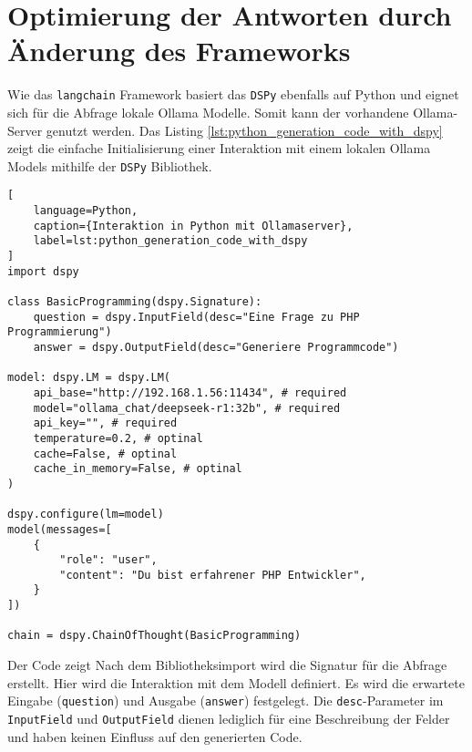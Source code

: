 \section{Optimierung der Antworten durch Änderung des Frameworks}
Wie das \texttt{langchain} Framework basiert das \texttt{DSPy} ebenfalls auf Python und eignet sich für die Abfrage lokale Ollama Modelle. Somit kann der vorhandene Ollama-Server genutzt werden.
Das Listing \ref{lst:python_generation_code_with_dspy} zeigt die einfache Initialisierung einer Interaktion mit einem lokalen Ollama Models mithilfe der \texttt{DSPy} Bibliothek.\vspace{0.2cm}

\begin{lstlisting}[
	language=Python,
	caption={Interaktion in Python mit Ollamaserver},
	label=lst:python_generation_code_with_dspy
]
import dspy

class BasicProgramming(dspy.Signature):
    question = dspy.InputField(desc="Eine Frage zu PHP Programmierung")
    answer = dspy.OutputField(desc="Generiere Programmcode")

model: dspy.LM = dspy.LM(
    api_base="http://192.168.1.56:11434", # required
    model="ollama_chat/deepseek-r1:32b", # required
    api_key="", # required
    temperature=0.2, # optinal
    cache=False, # optinal
    cache_in_memory=False, # optinal
)

dspy.configure(lm=model)
model(messages=[
    {
        "role": "user",
        "content": "Du bist erfahrener PHP Entwickler",
    }
])

chain = dspy.ChainOfThought(BasicProgramming)
\end{lstlisting}

Der Code zeigt Nach dem Bibliotheksimport wird die Signatur für die Abfrage erstellt. Hier wird die Interaktion mit dem Modell definiert. Es wird die erwartete Eingabe (\texttt{question}) und Ausgabe (\texttt{answer}) festgelegt. Die \texttt{desc}-Parameter im \texttt{InputField} und \texttt{OutputField} dienen lediglich für eine Beschreibung der Felder und haben keinen Einfluss auf den generierten Code.\vspace{0.2cm}

